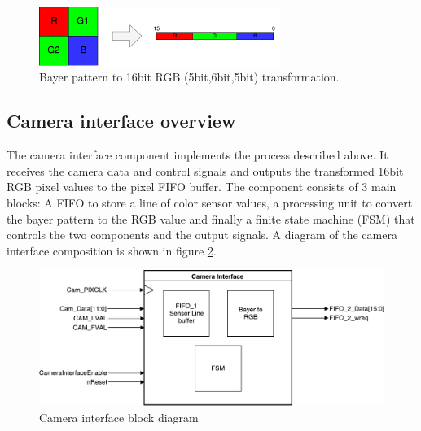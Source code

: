 \documentclass{article}
\begin{document}
\begin{figure}[H]
\centering
\includegraphics[width=0.7\textwidth]{img/CamBayerToRGB.pdf}
\caption{Bayer pattern to 16bit RGB (5bit,6bit,5bit) transformation.}
\label{fig:bayer_to_rgb}
\end{figure}

\subsection{Camera interface overview}
The camera interface component implements the process described above. It receives the camera data and control signals and outputs the transformed 16bit RGB pixel values to the pixel FIFO buffer.
The component consists of 3 main blocks: A FIFO to store a line of color sensor values, a processing unit to convert the bayer pattern to the RGB value and finally a finite state machine (FSM) that controls the two components and the output signals.
A diagram of the camera interface composition is shown in figure \ref{fig:camera_interface}.

\begin{figure}[H]
\centering
\includegraphics[width=\textwidth]{img/CameraInterface.pdf}
\caption{Camera interface block diagram}
\label{fig:camera_interface}
\end{figure}
\end{document}
